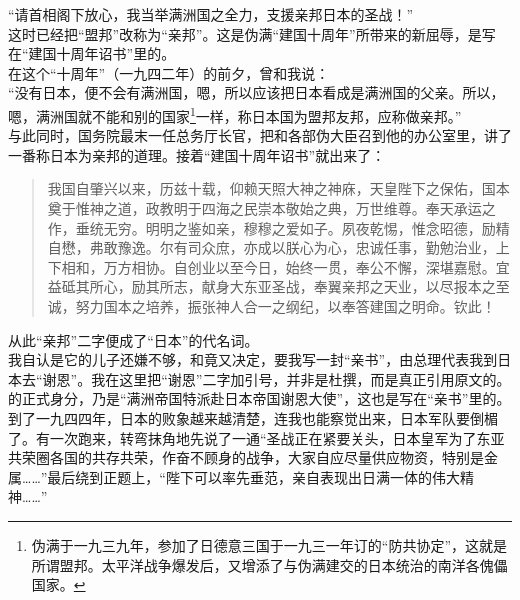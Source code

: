 “请首相阁下放心，我当举满洲国之全力，支援亲邦日本的圣战！”\\

这时已经把“盟邦”改称为“亲邦”。这是伪满“建国十周年”所带来的新屈辱，是写在“建国十周年诏书”里的。\\

在这个“十周年”（一九四二年）的前夕，曾和我说：\\

“没有日本，便不会有满洲国，嗯，所以应该把日本看成是满洲国的父亲。所以，嗯，满洲国就不能和别的国家\footnote{伪满于一九三九年，参加了日德意三国于一九三一年订的“防共协定”，这就是所谓盟邦。太平洋战争爆发后，又增添了与伪满建交的日本统治的南洋各傀儡国家。}一样，称日本国为盟邦友邦，应称做亲邦。”\\

与此同时，国务院最末一任总务厅长官，把和各部伪大臣召到他的办公室里，讲了一番称日本为亲邦的道理。接着“建国十周年诏书”就出来了：\\

\begin{quote}
	我国自肇兴以来，历兹十载，仰赖天照大神之神庥，天皇陛下之保佑，国本奠于惟神之道，政教明于四海之民崇本敬始之典，万世维尊。奉天承运之作，垂统无穷。明明之鉴如亲，穆穆之爱如子。夙夜乾惕，惟念昭德，励精自懋，弗敢豫逸。尔有司众庶，亦成以朕心为心，忠诚任事，勤勉治业，上下相和，万方相协。自创业以至今日，始终一贯，奉公不懈，深堪嘉慰。宜益砥其所心，励其所志，献身大东亚圣战，奉翼亲邦之天业，以尽报本之至诚，努力国本之培养，振张神人合一之纲纪，以奉答建国之明命。钦此！
\end{quote}

从此“亲邦”二字便成了“日本”的代名词。\\

我自认是它的儿子还嫌不够，和竟又决定，要我写一封“亲书”，由总理代表我到日本去“谢恩”。我在这里把“谢恩”二字加引号，并非是杜撰，而是真正引用原文的。的正式身分，乃是“满洲帝国特派赴日本帝国谢恩大使”，这也是写在“亲书”里的。\\

到了一九四四年，日本的败象越来越清楚，连我也能察觉出来，日本军队要倒楣了。有一次跑来，转弯抹角地先说了一通“圣战正在紧要关头，日本皇军为了东亚共荣圈各国的共存共荣，作奋不顾身的战争，大家自应尽量供应物资，特别是金属……”最后绕到正题上，“陛下可以率先垂范，亲自表现出日满一体的伟大精神……”\\

